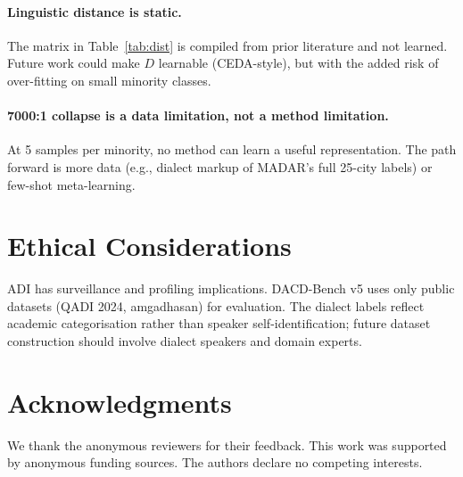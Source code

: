 \documentclass[11pt,a4paper,twocolumn]{article}
\newcommand{\bench}{DACD-Bench}
\newcommand{\ceda}{CEDA}
\begin{document}
\paragraph{Linguistic distance is static.}
The matrix in Table~\ref{tab:dist} is compiled from prior literature
and not learned. Future work could make $D$ learnable
(\ceda{}-style), but with the added risk of over-fitting on small
minority classes.

\paragraph{7000:1 collapse is a data limitation, not a method
limitation.} At 5 samples per minority, no method can learn a
useful representation. The path forward is more data (e.g., dialect
markup of MADAR's full 25-city labels) or few-shot meta-learning.

\section{Ethical Considerations}
ADI has surveillance and profiling implications. \bench{} v5 uses
only public datasets (QADI 2024, amgadhasan) for evaluation. The
dialect labels reflect academic categorisation rather than speaker
self-identification; future dataset construction should involve
dialect speakers and domain experts.

\section*{Acknowledgments}
We thank the anonymous reviewers for their feedback. This work was
supported by anonymous funding sources. The authors declare no
competing interests.



\end{document}
